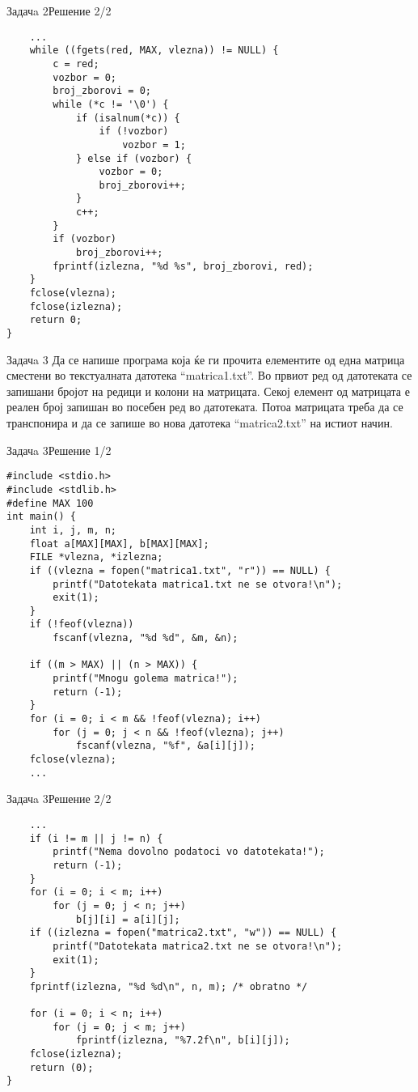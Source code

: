 \begin{frame}[fragile]{Задачa 2}{Решение 2/2} 
\begin{lstlisting}
    ...
    while ((fgets(red, MAX, vlezna)) != NULL) {
        c = red;
        vozbor = 0;
        broj_zborovi = 0;
        while (*c != '\0') {
            if (isalnum(*c)) {
                if (!vozbor)
                    vozbor = 1;
            } else if (vozbor) {
                vozbor = 0;
                broj_zborovi++;
            }
            c++;
        }
        if (vozbor)
            broj_zborovi++;
        fprintf(izlezna, "%d %s", broj_zborovi, red);
    }
    fclose(vlezna);
    fclose(izlezna);
    return 0;
}
\end{lstlisting}
\end{frame}

\begin{frame}{Задачa 3}
Да се напише програма која ќе ги прочита елементите од една матрица сместени во
текстуалната датотека ``matrica1.txt''. Во првиот ред од датотеката се запишани
бројот на редици и колони на матрицата. Секој елемент од матрицата е реален број
запишан во посебен ред во датотеката. Потоа матрицата треба да се транспонира и
да се запише во нова датотека ``matrica2.txt'' на истиот начин.
\end{frame}

\begin{frame}[fragile]{Задачa 3}{Решение 1/2} 
\begin{lstlisting}
#include <stdio.h>
#include <stdlib.h>
#define MAX 100
int main() {
    int i, j, m, n;
    float a[MAX][MAX], b[MAX][MAX];
    FILE *vlezna, *izlezna;
    if ((vlezna = fopen("matrica1.txt", "r")) == NULL) {
        printf("Datotekata matrica1.txt ne se otvora!\n");
        exit(1);
    }
    if (!feof(vlezna))
        fscanf(vlezna, "%d %d", &m, &n);

    if ((m > MAX) || (n > MAX)) {
        printf("Mnogu golema matrica!");
        return (-1);
    }
    for (i = 0; i < m && !feof(vlezna); i++)
        for (j = 0; j < n && !feof(vlezna); j++)
            fscanf(vlezna, "%f", &a[i][j]);
    fclose(vlezna);
    ...
\end{lstlisting}
\end{frame}



\begin{frame}[fragile]{Задачa 3}{Решение 2/2} 
\begin{lstlisting}
    ...
    if (i != m || j != n) {
        printf("Nema dovolno podatoci vo datotekata!");
        return (-1);
    }
    for (i = 0; i < m; i++)
        for (j = 0; j < n; j++)
            b[j][i] = a[i][j];
    if ((izlezna = fopen("matrica2.txt", "w")) == NULL) {
        printf("Datotekata matrica2.txt ne se otvora!\n");
        exit(1);
    }
    fprintf(izlezna, "%d %d\n", n, m); /* obratno */

    for (i = 0; i < n; i++)
        for (j = 0; j < m; j++)
            fprintf(izlezna, "%7.2f\n", b[i][j]);
    fclose(izlezna);
    return (0);
}
\end{lstlisting}
\end{frame}


